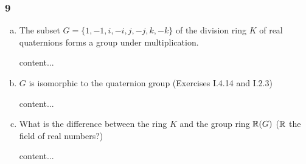 \subsubsection*{9}
\begin{enumerate}[(a)]
	\item 
	\begin{graybox}
		The subset $G = \{1,-1,i,-i,j,-j,k,-k\}$ of the division ring $K$ of real quaternions forms a group under multiplication.
	\end{graybox}
	\begin{solution}
		content...
	\end{solution}
	
	\item
	\begin{graybox}
		$G$ is isomorphic to the quaternion group (Exercises I.4.14 and I.2.3)
	\end{graybox}
	\begin{solution}
		content...
	\end{solution}
	
	\item
	\begin{graybox}
		What is the difference between the ring $K$ and the group ring $\mathbb{R}(G)$ ($\mathbb{R}$ the field of real numbers?)
	\end{graybox}
	\begin{solution}
		content...
	\end{solution}
\end{enumerate}

